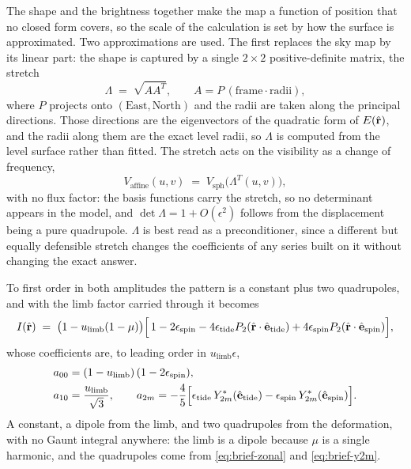 The shape and the brightness together make the map a function of position that no closed form
covers, so the scale of the calculation is set by how the surface is approximated.  Two
approximations are used.  The first replaces the sky map by its linear part: the shape is
captured by a single $2\times2$ positive-definite matrix, the stretch
\begin{equation}
  \Lambda \;=\; \sqrt{A A^{T}} , \qquad A = P\,(\text{frame}\cdot\text{radii}) ,
  \label{eq:brief-stretch}
\end{equation}
where $P$ projects onto $(\text{East},\text{North})$ and the radii are taken along the
principal directions.  Those directions are the eigenvectors of the quadratic form of
$E(\hat{\mathbf r})$, and the radii along them are the exact level radii, so $\Lambda$ is computed from the
level surface rather than fitted.  The stretch acts on the visibility as a change of
frequency,
\begin{equation}
  V_\text{affine}(u,v) \;=\; V_\text{sph}\bigl(\Lambda^{T}(u,v)\bigr) ,
  \label{eq:brief-affine}
\end{equation}
with no flux factor: the basis functions carry the stretch, so no determinant appears in the
model, and $\det\Lambda = 1 + O(\epsilon^2)$ follows from the displacement being a pure
quadrupole.  $\Lambda$ is best read as a preconditioner, since a different but
equally defensible stretch changes the coefficients of any series built on it without
changing the exact answer.

To first order in both amplitudes the pattern is a constant plus two quadrupoles, and with
the limb factor carried through it becomes
\begin{equation}
  I(\hat{\mathbf r}) \;=\; \bigl(1 - u_\text{limb}(1-\mu)\bigr)\Bigl[\,1 - 2\epsilon_\text{spin}
  - 4\epsilon_\text{tide}{}P_2(\hat{\mathbf r}\cdot\hat{\mathbf e}_\text{tide})
  + 4\epsilon_\text{spin}{}P_2(\hat{\mathbf r}\cdot\hat{\mathbf e}_\text{spin})\Bigr] ,
  \label{eq:brief-first-order}
\end{equation}
whose coefficients are, to leading order in $u_\text{limb}\epsilon$,
\begin{equation}
  \begin{aligned}
    a_{00} &= (1-u_\text{limb})\,(1-2\epsilon_\text{spin}) , \\
    a_{10} &= \frac{u_\text{limb}}{\sqrt3} , \qquad
    a_{2m} = -\frac{4}{5}\Bigl[\epsilon_\text{tide}\,Y_{2m}^*(\hat{\mathbf e}_\text{tide})
    - \epsilon_\text{spin}\,Y_{2m}^*(\hat{\mathbf e}_\text{spin})\Bigr] .
  \end{aligned}
  \label{eq:brief-first-order-coefficients}
\end{equation}
A constant, a dipole from the limb, and two quadrupoles from the deformation, with no Gaunt
integral anywhere: the limb is a dipole because $\mu$ is a single harmonic, and the
quadrupoles come from \eqref{eq:brief-zonal} and \eqref{eq:brief-y2m}.

